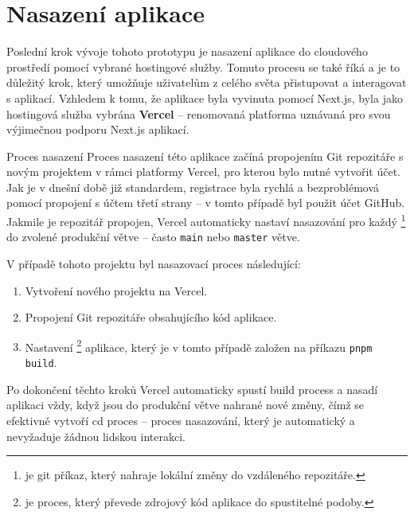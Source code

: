 \section{Nasazení aplikace}
\label{sec:implementace-deployment}
Poslední krok vývoje tohoto prototypu je nasazení aplikace do cloudového prostředí pomocí vybrané hostingové služby.
Tomuto procesu se také říká  a je to důležitý krok, který umožňuje uživatelům z celého světa přistupovat a interagovat s aplikací.
Vzhledem k tomu, že aplikace byla vyvinuta pomocí Next.js, byla jako hostingová služba vybrána \textbf{Vercel} – renomovaná platforma uznávaná pro svou výjimečnou podporu Next.js aplikací\cite{vd_vercel_com_docs}.

\begin{subsection}{Proces nasazení}
    \label{subsec:implementace-proces-nasazeni}
    Proces nasazení této aplikace začíná propojením Git repozitáře s novým projektem v rámci platformy Vercel, pro kterou bylo nutné vytvořit účet.
    Jak je v dnešní době již standardem, registrace byla rychlá a bezproblémová pomocí propojení s účtem třetí strany – v tomto případě byl použit účet GitHub.
    Jakmile je repozitář propojen, Vercel automaticky nastaví nasazování pro každý \footnote{ je git příkaz, který nahraje lokální změny do vzdáleného repozitáře\cite{g_docs_git_push}.} do zvolené produkční větve – často \texttt{main} nebo \texttt{master} větve.

    V případě tohoto projektu byl nasazovací proces následující:
    \begin{enumerate}
        \item Vytvoření nového projektu na Vercel.
        \item Propojení Git repozitáře obsahujícího kód aplikace.
        \item Nastavení \footnote{ je proces, který převede zdrojový kód aplikace do spustitelné podoby.} aplikace, který je v tomto případě založen na příkazu \texttt{pnpm build}.
    \end{enumerate}

    Po dokončení těchto kroků Vercel automaticky spustí build process a nasadí aplikaci vždy, když jsou do produkční větve nahrané nové změny, čímž se efektivně vytvoří \ac{cd} proces – proces nasazování, který je automatický a nevyžaduje žádnou lidskou interakci.
\end{subsection}

